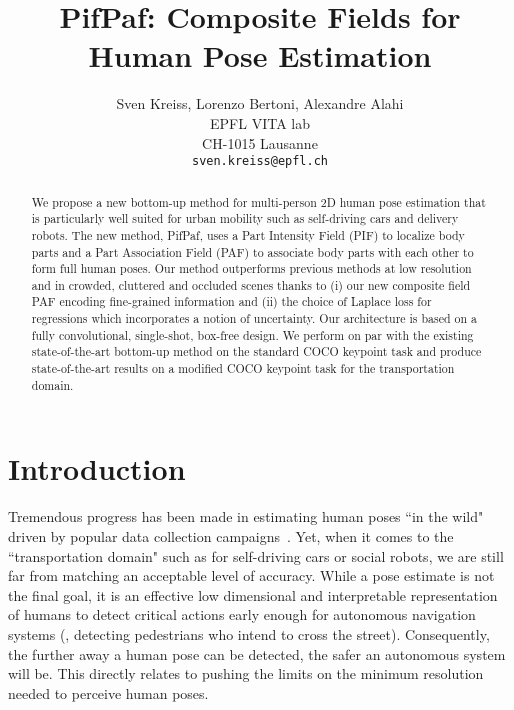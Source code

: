 \documentclass[10pt,twocolumn,letterpaper]{article}
\begin{document}
\title{PifPaf: Composite Fields for Human Pose Estimation}



\author{Sven Kreiss, Lorenzo Bertoni, Alexandre Alahi\\
EPFL VITA lab\\
CH-1015 Lausanne\\
{\tt\small sven.kreiss@epfl.ch}
}

\maketitle







\begin{abstract}
    We propose a new bottom-up method for multi-person 2D human pose
    estimation that is particularly well suited for urban mobility such as self-driving cars
    and delivery robots. The new method, PifPaf, uses a Part Intensity Field (PIF) to
    localize body parts and a Part Association Field (PAF) to associate body parts with each other to form
    full human poses.
    Our method outperforms previous methods at low resolution and in crowded,
    cluttered and occluded scenes
    thanks to (i) our new composite field PAF encoding fine-grained information and (ii) the choice of Laplace loss for regressions which incorporates a notion of uncertainty.
    Our architecture is based on a fully
    convolutional, single-shot, box-free design.
    We perform on par with the existing
    state-of-the-art bottom-up method on the standard COCO keypoint task
    and produce state-of-the-art results on a modified COCO keypoint task for
    the transportation domain.
\end{abstract}


\section{Introduction}

Tremendous progress has been made in estimating human poses ``in the wild"  driven by popular data collection campaigns~\cite{andriluka14cvpr,lin2014microsoft}. Yet, when it comes to the ``transportation domain" such as for self-driving cars or social robots, we are still far from matching an acceptable level of accuracy. While a pose estimate is not the final goal, it is an effective low dimensional and interpretable representation of humans to detect critical actions early enough for autonomous navigation systems  (\eg, detecting pedestrians who intend to cross the street). Consequently, the further away a human pose can be detected, the safer an autonomous system will be. This directly relates to pushing the limits on the minimum resolution needed to perceive human poses.
\end{document}
